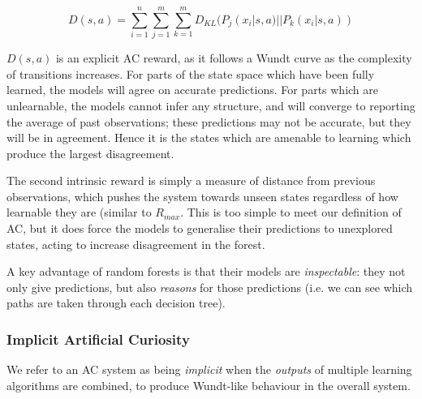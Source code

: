 \documentclass[]{article}
\begin{document}
\begin{equation}
  D(s,a) = \sum_{i = 1}^n \sum_{j = 1}^m \sum_{k = 1}^m D_{KL}(P_j(x_i|s,a) || P_k(x_i|s,a))
\end{equation}

$D(s,a)$ is an explicit AC reward, as it follows a Wundt curve as the complexity of transitions increases. For parts of the state space which have been fully learned, the models will agree on accurate predictions. For parts which are unlearnable, the models cannot infer any structure, and will converge to reporting the average of past observations; these predictions may not be accurate, but they will be in agreement. Hence it is the states which are amenable to learning which produce the largest disagreement.

The second intrinsic reward is simply a measure of distance from previous observations, which pushes the system towards unseen states regardless of how learnable they are (similar to $R_{max}$. This is too simple to meet our definition of AC, but it does force the models to generalise their predictions to unexplored states, acting to increase disagreement in the forest.

A key advantage of random forests is that their models are \emph{inspectable}: they not only give predictions, but also \emph{reasons} for those predictions (i.e. we can see which paths are taken through each decision tree). %


\subsubsection{Implicit Artificial Curiosity}

We refer to an AC system as being \emph{implicit} when the \emph{outputs} of multiple learning algorithms are combined, to produce Wundt-like behaviour in the overall system. %
\end{document}
